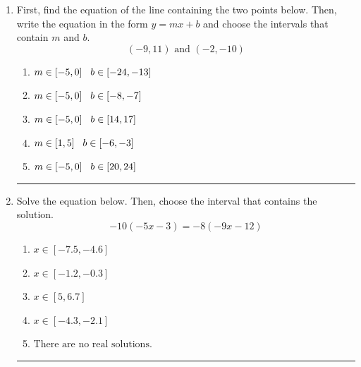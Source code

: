 \documentclass[14pt]{extbook}
\newcommand{\litem}[1]{\item#1\hspace*{-1cm}\rule{\textwidth}{0.4pt}}
\begin{document}
\begin{enumerate}
{\begin{enumerate}[label=\Alph*.]
\end{enumerate} }
\litem{
First, find the equation of the line containing the two points below. Then, write the equation in the form $ y=mx+b $ and choose the intervals that contain $m$ and $b$.\[ (-9, 11) \text{ and } (-2, -10) \]\begin{enumerate}[label=\Alph*.]
\item \( m \in [-5, 0] \hspace*{3mm} b \in [-24, -13] \)
\item \( m \in [-5, 0] \hspace*{3mm} b \in [-8, -7] \)
\item \( m \in [-5, 0] \hspace*{3mm} b \in [14, 17] \)
\item \( m \in [1, 5] \hspace*{3mm} b \in [-6, -3] \)
\item \( m \in [-5, 0] \hspace*{3mm} b \in [20, 24] \)

\end{enumerate} }
\litem{
Solve the equation below. Then, choose the interval that contains the solution.\[ -10(-5x -3) = -8(-9x -12) \]\begin{enumerate}[label=\Alph*.]
\item \( x \in [-7.5, -4.6] \)
\item \( x \in [-1.2, -0.3] \)
\item \( x \in [5, 6.7] \)
\item \( x \in [-4.3, -2.1] \)
\item \( \text{There are no real solutions.} \)

\end{enumerate} }
\end{enumerate}
\end{document}
